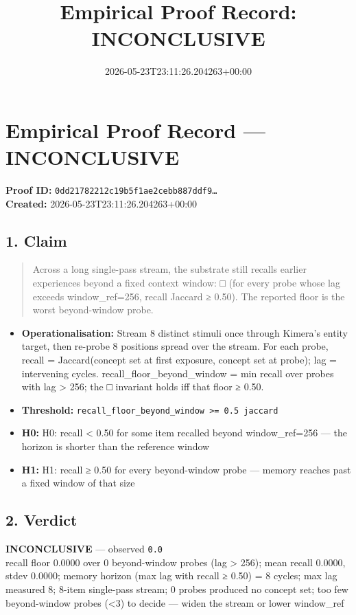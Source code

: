 \documentclass{article}
\title{Empirical Proof Record: INCONCLUSIVE}
\date{2026-05-23T23:11:26.204263+00:00}
\begin{document}
\maketitle
\section*{Empirical Proof Record --- \textcolor{inconclusive}{\textbf{INCONCLUSIVE}}}
\textbf{Proof ID:} \texttt{0dd21782212c19b5f1ae2cebb887ddf9\dots}\\
\textbf{Created:} 2026-05-23T23:11:26.204263+00:00
\subsection*{1. Claim}
\begin{quote}Across a long single-pass stream, the substrate still recalls earlier experiences beyond a fixed context window: □ (for every probe whose lag exceeds window\_ref=256, recall Jaccard ≥ 0.50). The reported floor is the worst beyond-window probe.\end{quote}
\begin{itemize}
\item \textbf{Operationalisation:} Stream 8 distinct stimuli once through Kimera's entity target, then re-probe 8 positions spread over the stream. For each probe, recall = Jaccard(concept set at first exposure, concept set at probe); lag = intervening cycles. recall\_floor\_beyond\_window = min recall over probes with lag > 256; the □ invariant holds iff that floor ≥ 0.50.
\item \textbf{Threshold:} \texttt{recall\_floor\_beyond\_window >= 0.5 jaccard}
\item \textbf{H0:} H0: recall < 0.50 for some item recalled beyond window\_ref=256 — the horizon is shorter than the reference window
\item \textbf{H1:} H1: recall ≥ 0.50 for every beyond-window probe — memory reaches past a fixed window of that size
\end{itemize}
\subsection*{2. Verdict}
\textcolor{inconclusive}{\textbf{INCONCLUSIVE}} --- observed \texttt{0.0}\\
recall floor 0.0000 over 0 beyond-window probes (lag > 256); mean recall 0.0000, stdev 0.0000; memory horizon (max lag with recall ≥ 0.50) = 8 cycles; max lag measured 8; 8-item single-pass stream; 0 probes produced no concept set; too few beyond-window probes (<3) to decide — widen the stream or lower window\_ref
\end{document}
